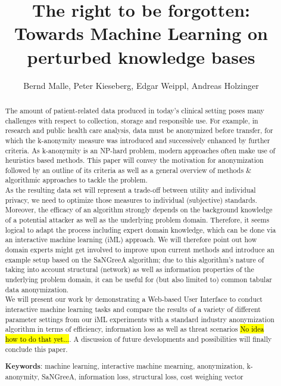 \documentclass{llncs}
\begin{document}
\title{The right to be forgotten:\\
Towards Machine Learning on perturbed knowledge bases}

\author{Bernd Malle, Peter Kieseberg, Edgar Weippl, Andreas Holzinger}

\maketitle

\begin{abstract}
	
The amount of patient-related data produced in today’s clinical setting poses many challenges with respect to collection, storage and responsible use. For example, in research and public health care analysis, data must be anonymized before transfer, for which the k-anonymity measure was introduced and successively enhanced by further criteria. As k-anonymity is an NP-hard problem, modern approaches often make use of heuristics based methods. This paper will convey the motivation for anonymization followed by an outline of its criteria as well as a general overview of methods \& algorithmic approaches to tackle the problem. \\

As the resulting data set will represent a trade-off between utility and individual privacy, we need to optimize those measures to individual (subjective) standards. Moreover, the efficacy of an algorithm strongly depends on the background knowledge of a potential attacker as well as the underlying problem domain. Therefore, it seems logical to adapt the process including expert domain knowledge, which can be done via an interactive machine learning (iML) approach. We will therefore point out how domain experts might get involved to improve upon current methods and introduce an example setup based on the SaNGreeA algorithm; due to this algorithm's nature of taking into account structural (network) as well as information properties of the underlying problem domain, it can be useful for (but also limited to) common tabular data anonymization. \\

We will present our work by demonstrating a Web-based User Interface to conduct interactive machine learning tasks and compare the results of a variety of different parameter settings from our iML experiments with a standard industry anonymization algorithm in terms of efficiency, information loss as well as threat scenarios \hl{No idea how to do that yet...}. A discussion of future developments and possibilities will finally conclude this paper.


\medskip

\textbf{Keywords}: machine learning, interactive machine mearning, anonymization, k-anonymity, SaNGreeA, information loss, structural loss, cost weighing vector


\end{abstract}
\end{document}
